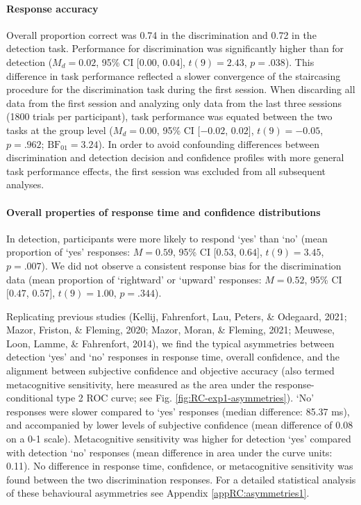 \documentclass[
  english,
  man]{apa6}
\let\oldparagraph\paragraph
\renewcommand{\paragraph}[1]{\oldparagraph{#1}\mbox{}}
\begin{document}
\hypertarget{response-accuracy}{%
\paragraph{Response accuracy}\label{response-accuracy}}

Overall proportion correct was 0.74 in the discrimination and 0.72 in the detection task. Performance for discrimination was significantly higher than for detection (\(M_d = 0.02\), 95\% CI \([0.00\), \(0.04]\), \(t(9) = 2.43\), \(p = .038\)). This difference in task performance reflected a slower convergence of the staircasing procedure for the discrimination task during the first session. When discarding all data from the first session and analyzing only data from the last three sessions (1800 trials per participant), task performance was equated between the two tasks at the group level (\(M_d = 0.00\), 95\% CI \([-0.02\), \(0.02]\), \(t(9) = -0.05\), \(p = .962\); \(\mathrm{BF}_{\textrm{01}} = 3.24\)). In order to avoid confounding differences between discrimination and detection decision and confidence profiles with more general task performance effects, the first session was excluded from all subsequent analyses.

\hypertarget{overall-properties-of-response-time-and-confidence-distributions}{%
\paragraph{Overall properties of response time and confidence distributions}\label{overall-properties-of-response-time-and-confidence-distributions}}

In detection, participants were more likely to respond `yes' than `no' (mean proportion of `yes' responses: \(M = 0.59\), 95\% CI \([0.53\), \(0.64]\), \(t(9) = 3.45\), \(p = .007\)). We did not observe a consistent response bias for the discrimination data (mean proportion of `rightward' or `upward' responses: \(M = 0.52\), 95\% CI \([0.47\), \(0.57]\), \(t(9) = 1.00\), \(p = .344\)).

Replicating previous studies (Kellij, Fahrenfort, Lau, Peters, \& Odegaard, 2021; Mazor, Friston, \& Fleming, 2020; Mazor, Moran, \& Fleming, 2021; Meuwese, Loon, Lamme, \& Fahrenfort, 2014), we find the typical asymmetries between detection `yes' and `no' responses in response time, overall confidence, and the alignment between subjective confidence and objective accuracy (also termed metacognitive sensitivity, here measured as the area under the response-conditional type 2 ROC curve; see Fig. \ref{fig:RC-exp1-asymmetries}). `No' responses were slower compared to `yes' responses (median difference: 85.37 ms), and accompanied by lower levels of subjective confidence (mean difference of 0.08 on a 0-1 scale). Metacognitive sensitivity was higher for detection `yes' compared with detection `no' responses (mean difference in area under the curve units: 0.11). No difference in response time, confidence, or metacognitive sensitivity was found between the two discrimination responses. For a detailed statistical analysis of these behavioural asymmetries see Appendix \ref{appRC:asymmetries1}.
\end{document}
